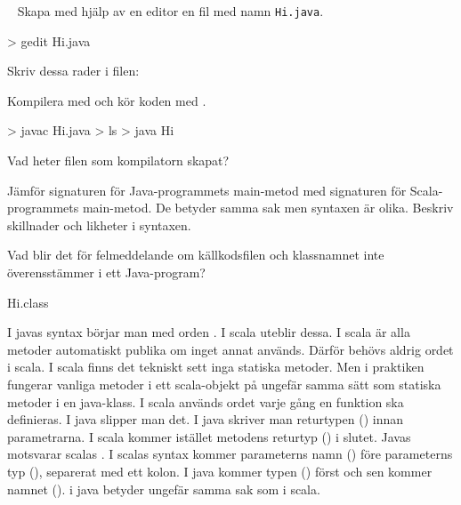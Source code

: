 \QUESTEND









\QUESTBEGIN

\Task \label{task:java} \what~   Skapa med hjälp av en editor en fil med namn \texttt{Hi.java}.
\begin{REPLnonum}
> gedit Hi.java
\end{REPLnonum}
Skriv dessa rader i filen:


\noindent Kompilera med  och kör koden med .
\begin{REPLnonum}
> javac Hi.java
> ls
> java Hi
\end{REPLnonum}

\Subtask\Pen Vad heter filen som kompilatorn skapat?

\Subtask\Pen Jämför signaturen för Java-programmets main-metod med signaturen för Scala-programmets main-metod. De betyder samma sak men syntaxen är olika. Beskriv skillnader och likheter i syntaxen.

\Subtask\Pen Vad blir det för felmeddelande om källkodsfilen och klassnamnet inte överensstämmer i ett Java-program?


\SOLUTION


\TaskSolved \what
 

\SubtaskSolved  Hi.class

\SubtaskSolved  I javas syntax börjar man med orden . I scala uteblir dessa. I scala är alla metoder automatiskt publika om inget annat används. Därför behövs aldrig ordet  i scala. I scala finns det tekniskt sett inga statiska metoder. Men i praktiken fungerar vanliga metoder i ett scala-objekt på ungefär samma sätt som statiska metoder i en java-klass. I scala används ordet  varje gång en funktion ska definieras. I java slipper man det. I java skriver man returtypen () innan parametrarna. I scala kommer istället metodens returtyp () i slutet. Javas  motsvarar scalas . I scalas syntax kommer parameterns namn () före parameterns typ (), separerat med ett kolon. I java kommer typen () först och sen kommer namnet ().  i java betyder ungefär samma sak som  i scala.

